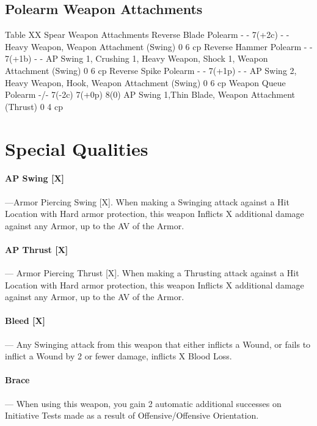 \documentclass[oneside,11pt,english]{book}
\begin{document}
\subsection{Polearm Weapon Attachments} %
Table XX Spear Weapon Attachments
Reverse Blade Polearm - - 7(+2c) - - Heavy Weapon, Weapon Attachment (Swing) 0 6 cp
Reverse Hammer Polearm - - 7(+1b) - - AP Swing 1, Crushing 1, Heavy Weapon, Shock 1, Weapon Attachment (Swing) 0 6 cp
Reverse Spike Polearm - - 7(+1p) - - AP Swing 2, Heavy Weapon, Hook, Weapon Attachment (Swing) 0 6 cp
Weapon Queue Polearm -/- 7(-2c) 7(+0p) 8(0) AP Swing 1,Thin Blade, Weapon Attachment (Thrust) 0 4 cp

\section{Special Qualities}\label{sec:special-qualities}
\paragraph{\label{par:AP Swing}AP Swing [X]}---\quad Armor Piercing Swing [X]. When making a Swinging attack against a Hit Location with Hard armor protection, this weapon Inflicts X additional damage against any Armor, up to the AV of the Armor.

\paragraph{\label{par:AP Thrust}AP Thrust [X]}---\quad
Armor Piercing Thrust [X]. When making a Thrusting attack against a Hit Location with Hard armor protection, this weapon Inflicts X additional damage against any Armor, up to the AV of the Armor.

\paragraph{\label{par:Bleed}Bleed [X]}---\quad
Any Swinging attack from this weapon that either inflicts a Wound, or fails to inflict a Wound by 2 or fewer damage, inflicts X Blood Loss. 
\paragraph{\label{par:Brace}Brace}---\quad
When using this weapon, you gain 2 automatic additional successes on Initiative Tests made as a result of Offensive/Offensive Orientation.
\end{document}
